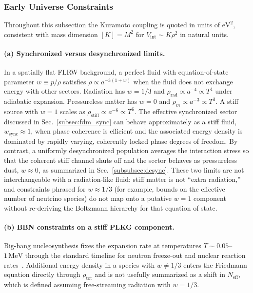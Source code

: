 \subsubsection{Early Universe Constraints}
\label{subsubsec:early-universe}

Throughout this subsection the Kuramoto coupling is quoted in units of $\mathrm{eV}^2$, consistent with mass dimension $[K]=M^2$ for $V_{\mathrm{int}}\sim K\rho^2$ in natural units.

\paragraph{(a) Synchronized versus desynchronized limits.}
In a spatially flat FLRW background, a perfect fluid with equation-of-state parameter $w\equiv p/\rho$ satisfies $\rho\propto a^{-3(1+w)}$ when the fluid does not exchange energy with other sectors.
Radiation has $w=1/3$ and $\rho_{\mathrm{rad}}\propto a^{-4}\propto T^4$ under adiabatic expansion.
Pressureless matter has $w=0$ and $\rho_{m}\propto a^{-3}\propto T^3$.
A stiff source with $w=1$ scales as $\rho_{\mathrm{stiff}}\propto a^{-6}\propto T^6$.
The effective synchronized sector discussed in Sec.~\ref{subsec:fdm_sync} can behave approximately as a stiff fluid, $w_{\mathrm{sync}}\approx 1$, when phase coherence is efficient and the associated energy density is dominated by rapidly varying, coherently locked phase degrees of freedom.
By contrast, a uniformly desynchronized population averages the interaction stress so that the coherent stiff channel shuts off and the sector behaves as pressureless dust, $w\approx 0$, as summarized in Sec.~\ref{subsubsec:desync}.
These two limits are not interchangeable with a radiation-like fluid: stiff matter is not ``extra radiation,'' and constraints phrased for $w\approx 1/3$ (for example, bounds on the effective number of neutrino species) do not map onto a putative $w=1$ component without re-deriving the Boltzmann hierarchy for that equation of state.

\paragraph{(b) BBN constraints on a stiff PLKG component.}
Big-bang nucleosynthesis fixes the expansion rate at temperatures $T\sim 0.05$--$1\,\mathrm{MeV}$ through the standard timeline for neutron freeze-out and nuclear reaction rates~\cite{Cyburt2016}.
Additional energy density in a species with $w\neq 1/3$ enters the Friedmann equation directly through $\rho_{\mathrm{tot}}$ and is not usefully summarized as a shift in $N_{\mathrm{eff}}$, which is defined assuming free-streaming radiation with $w=1/3$.

